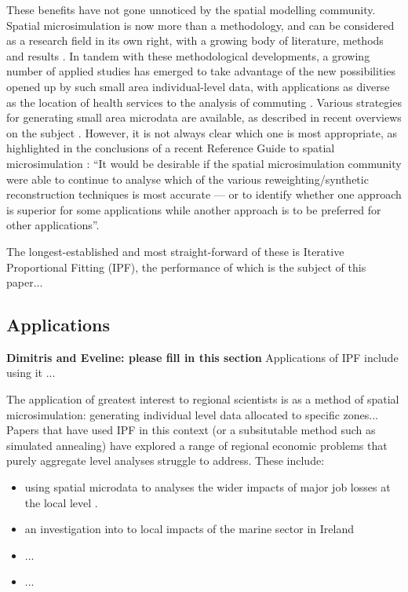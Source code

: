 \documentclass[a4paper,10pt]{article}
\begin{document}

These benefits have not gone unnoticed by the spatial modelling community.
Spatial microsimulation is now more than a methodology, and
can be considered as a research field in its
own right, with a growing body of literature, methods and results \citep{Tanton2013}.
In tandem with these methodological developments, a growing number of applied studies
has emerged to take advantage of the new possibilities opened up by such small area individual-level data,
with applications as diverse as the location of health services \citep{Tomintz2008} to the
analysis of commuting \citep{Lovelace2014-jtg}.
Various strategies for generating small area microdata are available,
as described in recent overviews on the subject \citep{Tanton2013, Ballas2013-4policy-analysis, Hermes2012a}.
However, it is not always clear which one is most appropriate,
as highlighted in the conclusions of a recent Reference Guide to spatial microsimulation
\citep[p~270]{Clarke2013-concs}:
``It would be desirable if the spatial microsimulation community were able to continue to
analyse which of the various reweighting/synthetic reconstruction techniques is most accurate
--- or to identify whether one approach is superior for some applications while another
approach is to be preferred for other applications''.

The longest-established and most straight-forward of these is Iterative Proportional Fitting (IPF), the performance of which is the subject of this paper...

\subsection{Applications}
\textbf{Dimitris and Eveline: please fill in this section}
Applications of IPF include using it ...

The application of greatest interest to regional scientists is as a method of 
spatial microsimulation: generating individual level data allocated to specific zones...
Papers that have used IPF in this context (or a subsitutable method such as simulated annealing)
have explored a range of regional economic problems that purely aggregate level analyses struggle to address.
These include:
\begin{itemize}
 \item using spatial microdata to analyses the wider impacts of major job losses
at the local level \citep{Ballas2006}.
\item an investigation into to local impacts of the marine sector in Ireland \citep{Morrissey2013a}
\item ...
\item ...
\end{itemize}
\end{document}

